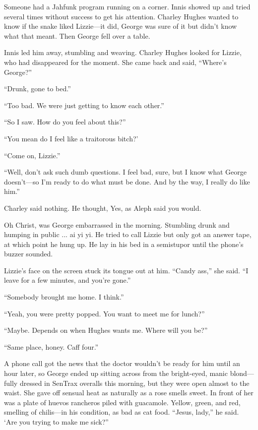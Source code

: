 Someone had a Jahfunk program running on a corner. Innis showed up and tried several times without success to get his attention. Charley Hughes wanted to know if the snake liked Lizzie—it did, George was sure of it but didn't know what that meant. Then George fell over a table.

Innis led him away, stumbling and weaving. Charley Hughes looked for Lizzie, who had disappeared for the moment. She came back and said, ``Where's George?''

``Drunk, gone to bed.''

``Too bad. We were just getting to know each other.''

``So I saw. How do you feel about this?''

``You mean do I feel like a traitorous bitch?'

``Come on, Lizzie.''

``Well, don't ask such dumb questions. I feel bad, sure, but I know what George doesn't—so I'm ready to do what must be done. And by the way, I really do like him.''

Charley said nothing. He thought, Yes, as Aleph said you would.

Oh Christ, was George embarrassed in the morning. Stumbling drunk and humping in public ... ai yi yi. He tried to call Lizzie but only got an answer tape, at which point he hung up. He lay in his bed in a semistupor until the phone's buzzer sounded.

Lizzie's face on the screen stuck its tongue out at him. ``Candy ass,'' she said. ``I leave for a few minutes, and you're gone.''

``Somebody brought me home. I think.''

``Yeah, you were pretty popped. You want to meet me for lunch?''

``Maybe. Depends on when Hughes wants me. Where will you be?''

``Same place, honey. Caff four.''

A phone call got the news that the doctor wouldn't be ready for him until an hour later, so George ended up sitting across from the bright-eyed, manic blond—fully dressed in SenTrax overalls this morning, but they were open almost to the waist. She gave off sensual heat as naturally as a rose smells sweet. In front of her was a plate of huevos rancheros piled with guacamole. Yellow, green, and red, smelling of chilis—in his condition, as bad as cat food. ``Jesus, lady,'' he said. ‘Are you trying to make me sick?''

